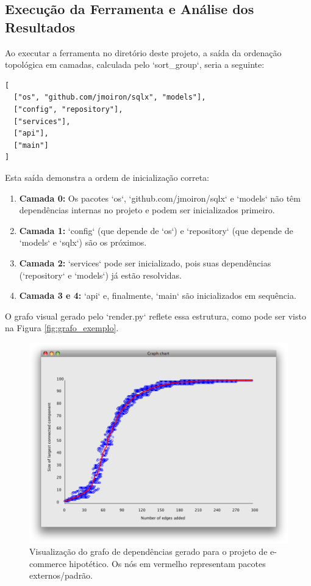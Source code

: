 \documentclass[12pt]{article}
\begin{document}
\subsection{Execução da Ferramenta e Análise dos Resultados}
Ao executar a ferramenta no diretório deste projeto, a saída da ordenação topológica em camadas, calculada pelo `sort\_group`, seria a seguinte:

\begin{verbatim}
[
  ["os", "github.com/jmoiron/sqlx", "models"],
  ["config", "repository"],
  ["services"],
  ["api"],
  ["main"]
]
\end{verbatim}

Esta saída demonstra a ordem de inicialização correta:
\begin{enumerate}
    \item \textbf{Camada 0:} Os pacotes `os`, `github.com/jmoiron/sqlx` e `models` não têm dependências internas no projeto e podem ser inicializados primeiro.
    \item \textbf{Camada 1:} `config` (que depende de `os`) e `repository` (que depende de `models` e `sqlx`) são os próximos.
    \item \textbf{Camada 2:} `services` pode ser inicializado, pois suas dependências (`repository` e `models`) já estão resolvidas.
    \item \textbf{Camada 3 e 4:} `api` e, finalmente, `main` são inicializados em sequência.
\end{enumerate}

O grafo visual gerado pelo `render.py` reflete essa estrutura, como pode ser visto na Figura \ref{fig:grafo_exemplo}.

\begin{figure}[ht]
\centering
\includegraphics[width=1\textwidth]{placeholderGraph.png} 
\caption{Visualização do grafo de dependências gerado para o projeto de e-commerce hipotético. Os nós em vermelho representam pacotes externos/padrão.}
\label{fig:grafoExemplo}
\end{figure}
\end{document}
